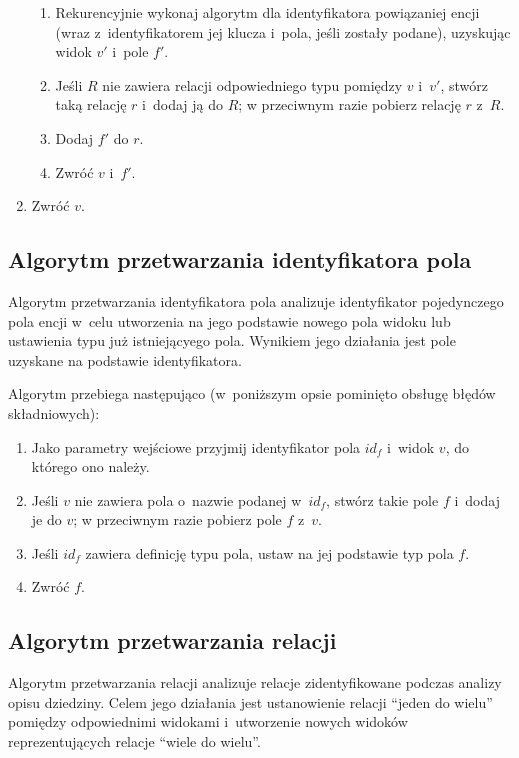 \begin{enumerate}
  \begin{enumerate}
   \item Rekurencyjnie wykonaj algorytm dla identyfikatora powiązaniej encji (wraz z~identyfikatorem jej klucza i~pola, jeśli zostały podane), uzyskując widok $v'$ i~pole $f'$.
   \item Jeśli $R$ nie zawiera relacji odpowiedniego typu pomiędzy $v$ i~$v'$, stwórz taką relację $r$ i~dodaj ją do $R$; w przeciwnym razie pobierz relację $r$ z~$R$.
   \item Dodaj $f'$ do $r$.
   \item Zwróć $v$ i~$f'$.
  \end{enumerate}
 \item Zwróć $v$.
\end{enumerate}


\subsection{Algorytm przetwarzania identyfikatora pola} \label{sec:field_id_processing}

Algorytm przetwarzania identyfikatora pola analizuje identyfikator pojedynczego pola encji w~celu utworzenia na jego podstawie nowego pola widoku lub ustawienia typu już istniejącyego pola.
Wynikiem jego działania jest pole uzyskane na podstawie identyfikatora.

Algorytm przebiega następująco (w~poniższym opsie pominięto obsługę błędów składniowych):

\begin{enumerate}
 \item Jako parametry wejściowe przyjmij identyfikator pola $id_f$ i~widok $v$, do którego ono należy.
 \item Jeśli $v$ nie zawiera pola o~nazwie podanej w~$id_f$, stwórz takie pole $f$ i~dodaj je do $v$; w przeciwnym razie pobierz pole $f$ z~$v$.
 \item Jeśli $id_f$ zawiera definicję typu pola, ustaw na jej podstawie typ pola $f$.
 \item Zwróć $f$.
\end{enumerate}


\subsection{Algorytm przetwarzania relacji} \label{sec:relation_processing}

Algorytm przetwarzania relacji analizuje relacje zidentyfikowane podczas analizy opisu dziedziny.
Celem jego działania jest ustanowienie relacji ``jeden do wielu'' pomiędzy odpowiednimi widokami i~utworzenie nowych widoków reprezentujących relacje ``wiele do wielu''.

